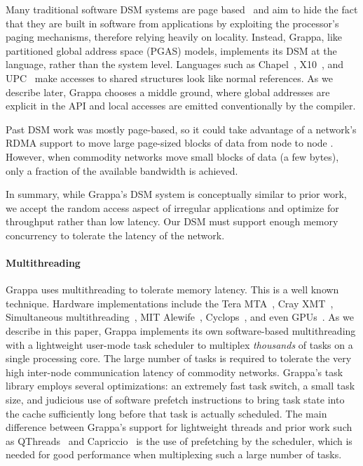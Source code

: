 Many traditional software DSM systems are page based~\cite{Treadmarks,munin}
and aim to hide the fact that they are built in software from applications by
exploiting the processor's paging mechanisms, therefore relying heavily on
locality. Instead, Grappa, like partitioned global address space (PGAS)
models, implements its DSM at the language, rather than the system level.
Languages such as Chapel~\cite{Chamberlain:2007}, X10~\cite{X10:2005}, and
UPC~\cite{upc:2005} make accesses to shared structures look like normal
references. As we describe later, Grappa chooses a middle ground, where global
addresses are explicit in the API and local accesses are emitted
conventionally by the compiler. 

Past DSM work was mostly page-based, so it could take advantage of a network's RDMA support to move large page-sized
blocks of data from node to node . However, when commodity networks move small
blocks of data (a few bytes), only a fraction of the available bandwidth is
achieved. 

In summary, while Grappa's DSM system is conceptually similar to prior work,
we accept the random access aspect of irregular applications and optimize for throughput rather than low latency.
Our DSM must support enough memory concurrency to tolerate the latency of the network.





\paragraph{Multithreading} Grappa uses multithreading to tolerate memory
latency. This is a well known technique. Hardware implementations include the
Tera MTA~\cite{tera:mta1}, Cray XMT~\cite{feo:xmt}, Simultaneous
multithreading~\cite{tullsen:smt}, MIT Alewife~\cite{agarwal:alewife},
Cyclops~\cite{almasi:cyclops}, and even GPUs~\cite{gpus}. As we describe in
this paper, Grappa implements its own software-based multithreading with a
lightweight user-mode task scheduler to multiplex \emph{thousands\/} of tasks
on a single processing core. The large number of tasks is required to tolerate
the very high inter-node communication latency of commodity networks. Grappa's
task library employs several optimizations: an extremely fast task switch, a
small task size, and judicious use of software prefetch instructions to bring task state
into the cache sufficiently long before that task is actually scheduled. The main difference
between Grappa's support for lightweight threads and prior work such as
QThreads~\cite{Wheeler08qthreads:an} and
Capriccio~\cite{Behren03capriccio:scalable} is the use of prefetching by the scheduler, which is needed for good performance
when multiplexing such a large number of tasks.

